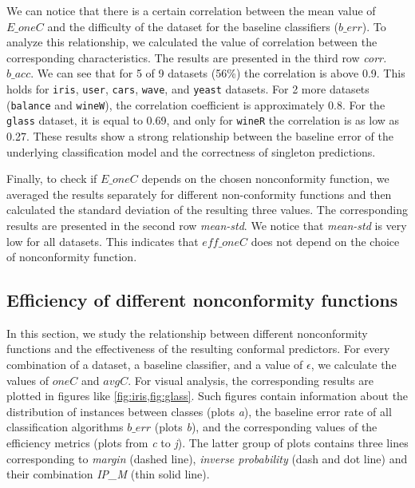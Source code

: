 We can notice that there is a certain correlation between the mean value of 
$E\_oneC$ and the difficulty of the dataset for the baseline classifiers 
($b\_err$). 
To analyze this relationship, we calculated the value of correlation between 
the corresponding characteristics.
The results are presented in the third row \textit{corr. $b\_acc$}.
We can see that for 5 of 9 datasets (56\%) the correlation is above 0.9. 
This holds for \verb|iris|, \verb|user|, \verb|cars|, \verb|wave|, and \verb|yeast| datasets.
For 2 more datasets (\verb|balance| and \verb|wineW|), the correlation coefficient is approximately 0.8.
For the \verb|glass| dataset, it is equal to 0.69, and only for \verb|wineR| the correlation is as low as 0.27.
These results show a strong relationship between the baseline error of the underlying classification model and the correctness of singleton predictions.

Finally, to check if $E\_oneC$ depends on the chosen nonconformity function, we averaged the results separately for different non-conformity functions and then calculated the standard deviation of the resulting three values.
The corresponding results are presented in the second row \textit{mean-std}.
We notice that \textit{mean-std} is very low for all datasets.
This indicates that $eff\_oneC$ does not depend on the choice of nonconformity function.

\subsection{Efficiency of different nonconformity functions}
\label{sec:experiments:efficiency}

In this section, we study the relationship between different nonconformity functions and the effectiveness of the resulting conformal predictors. 
For every combination of a dataset, a baseline classifier, and a value of $\epsilon$,
we calculate the values of $oneC$ and $avgC$. For visual analysis, the corresponding results
are plotted in figures like \cref{fig:iris,fig:glass}. Such figures contain information about
the distribution of instances between classes (plots \textit{a}), the baseline
error rate of all classification algorithms $b\_err$ (plots \textit{b}), and the 
corresponding values of the efficiency metrics (plots from \textit{c} to \textit{j}).
The latter group of plots contains three lines corresponding to \textit{margin} (dashed line),
\textit{inverse probability} (dash and dot line) and their combination \textit{IP\_M}
(thin solid line).

